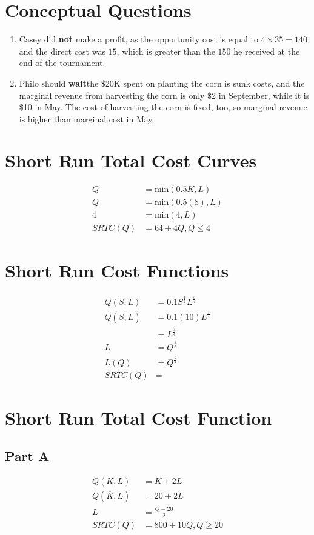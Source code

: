 \documentclass[8pt]{extarticle}
\begin{document}
{\section{Conceptual Questions}
\label{sec:Conceptual Questions}
\begin{enumerate}
	\item Casey did \textbf{not} make a profit, as the opportunity cost is equal to $4\times 35 = 140$ and the direct cost was $15$, which is greater than the $150$ he received at the end of the tournament.
	\item Philo should \textbf{wait}\textemdash the \$20K spent on planting the corn is sunk costs, and the marginal revenue from harvesting the corn is only \$2 in September, while it is \$10 in May. The cost of harvesting the corn is fixed, too, so marginal revenue is higher than marginal cost in May.
\end{enumerate}
\section{Short Run Total Cost Curves}
\label{sec:Short Run Total Cost Curves}
\begin{align*}
	\label{eq:}
	Q &= \textrm{min}(0.5K,L) \\
	Q &= \textrm{min}(0.5(8),L) \\
	4 &= \textrm{min}(4,L) \\
	SRTC(Q) &= 64 + 4Q, Q\leq 4
\end{align*}
\section{Short Run Cost Functions}
\label{sec:Short Run Cost Functions}
\begin{align*}
	\label{eq:}
	Q(S,L) &= 0.1S^{\frac{1}{2}}L^{\frac{3}{4}} \\
	Q(\overline{S},L) &= 0.1(10)L^{\frac{3}{4}} \\
	&= L^{\frac{3}{4}} \\
	L &= Q^{\frac{4}{3}} \\
	L(Q) &= Q^{\frac{3}{4}} \\
	SRTC(Q) &= 
\end{align*}
\section{Short Run Total Cost Function}
\label{sec:Short Run Total Cost Function}
\subsection*{Part A}
\begin{align*}
	\label{eq:}
	Q(K,L) &= K + 2L\\
	Q(\overline{K},L) &= 20 + 2L \\
	L &= \frac{Q-20}{2} \\
	SRTC(Q) &= 800 + 10Q, Q\geq 20
\end{align*}
}
\end{document}
